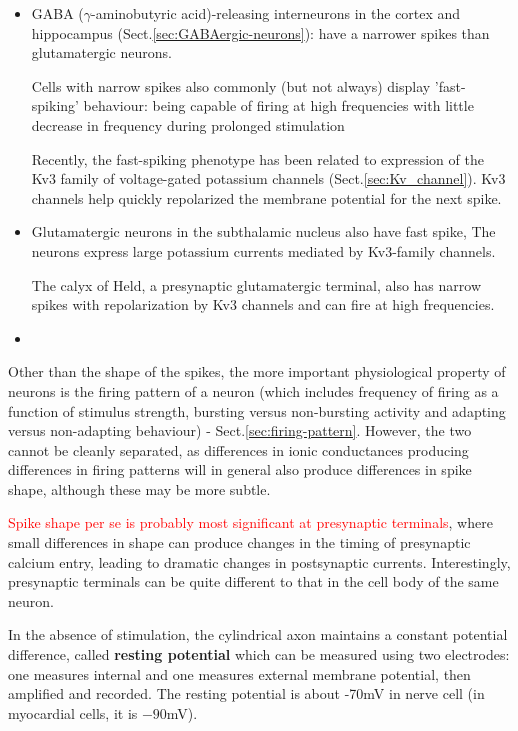  
\begin{itemize}
  \item GABA ($\gamma$-aminobutyric acid)-releasing
interneurons in the cortex and hippocampus (Sect.\ref{sec:GABAergic-neurons}):
have a narrower spikes than glutamatergic neurons.

Cells with narrow spikes also commonly (but not always) display 'fast-spiking'
behaviour: being capable of firing at high frequencies with little decrease in
frequency during prolonged stimulation

Recently, the fast-spiking phenotype has been related to
expression of the Kv3 family of voltage-gated potassium
channels (Sect.\ref{sec:Kv_channel}). Kv3 channels help quickly repolarized the
membrane potential for the next spike.
 
   \item Glutamatergic neurons in the  subthalamic nucleus also have fast spike, 
    The neurons express large potassium currents mediated by Kv3-family
    channels.
    
    The calyx of Held, a presynaptic glutamatergic terminal, also has narrow
spikes with repolarization by Kv3 channels and can fire at high frequencies.

   \item 

\end{itemize}

Other than the shape of the spikes, the more important physiological property of
neurons is the firing pattern of a neuron (which includes frequency of
firing as a function of stimulus strength, bursting versus non-bursting activity
and adapting versus non-adapting behaviour) - Sect.\ref{sec:firing-pattern}.
However, the two cannot be cleanly separated, as differences in ionic
conductances producing differences in firing patterns will in general also
produce differences in spike shape, although these may be more subtle.

\textcolor{red}{Spike shape per se is probably most significant at presynaptic
terminals},  where small differences in shape can produce changes in the timing
of presynaptic calcium entry, leading to dramatic changes in postsynaptic
currents. Interestingly, presynaptic terminals can be quite different to that in
the cell body of the same neuron.

In the absence of stimulation, the cylindrical axon maintains a
constant potential difference, called {\bf resting potential} which
can be measured using two electrodes: one measures internal and one
measures external membrane potential, then amplified and recorded. The
resting potential is about -70mV in nerve cell
(in myocardial cells, it is $-90$mV).

